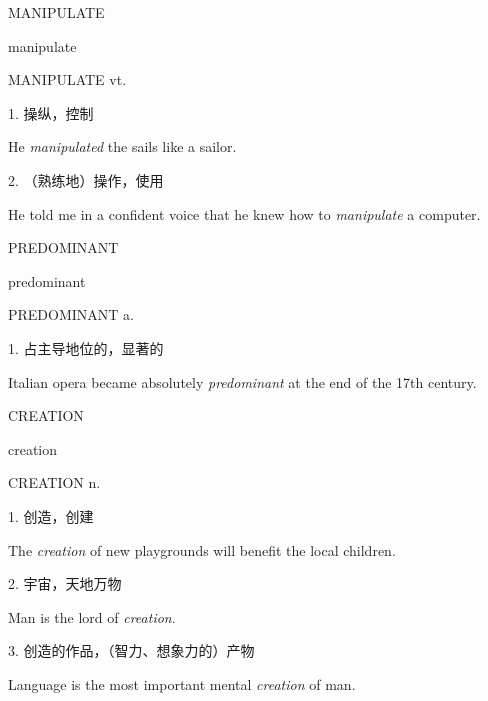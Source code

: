 \begin{flashcard}{
MANIPULATE

manipulate
}
\begin{center}
MANIPULATE vt. 
\end{center}
1. 操纵，控制

He \textit{manipulated} the sails like a sailor.

2. （熟练地）操作，使用

He told me in a confident voice that he knew how to \textit{manipulate} a computer.

\end{flashcard}
\begin{flashcard}{
PREDOMINANT

predominant
}
\begin{center}
PREDOMINANT a. 
\end{center}
1. 占主导地位的，显著的

Italian opera became absolutely \textit{predominant} at the end of the 17th century.

\end{flashcard}
\begin{flashcard}{
CREATION

creation
}
\begin{center}
CREATION n. 
\end{center}
1. 创造，创建

The \textit{creation} of new playgrounds will benefit the local children.

2. 宇宙，天地万物

Man is the lord of \textit{creation}.

3. 创造的作品，（智力、想象力的）产物

Language is the most important mental \textit{creation} of man.

\end{flashcard}
